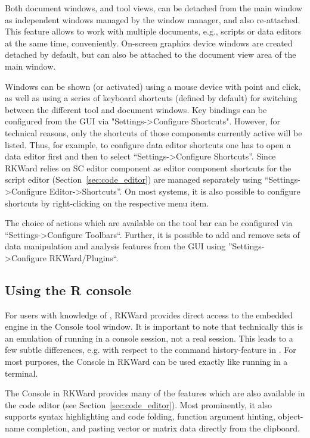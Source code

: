 Both document windows, and tool views, can be detached from the main
window as independent windows managed by the window manager, and also
re-attached. This feature allows to work with multiple documents, e.g.,
scripts or data editors at the same time, conveniently. On{}-screen
graphics device windows are created detached by default, but can also
be attached to the document view area of the main window.

Windows can be shown (or activated) using a mouse device with point and
click, as well as using a series of keyboard shortcuts (defined by
default) for switching between the different tool and document windows.
Key bindings can be configured from the GUI via "Settings->Configure Shortcuts". 
However, for technical reasons, only the shortcuts of those
components currently active will be listed. Thus, for example, to
configure data editor shortcuts one has to open a data editor first and
then to select ``Settings->Configure Shortcuts''. Since RKWard relies on
 SC editor component as editor component
shortcuts for the script editor (Section~\ref{sec:code_editor}) are managed separately using
``Settings->Configure Editor->Shortcuts''. On most systems, it is also
possible to configure shortcuts by right-clicking on the respective
menu item.

The choice of actions which are available on the tool bar can be
configured via ``Settings->Configure Toolbars``. Further, it is possible to add and remove sets
of data manipulation and analysis features from the GUI using
''Settings->Configure RKWard/Plugins``.

\subsection{Using the R console}
\label{sec:using_R_console}
For users with knowledge of , RKWard provides direct access to the
embedded  engine in the
 Console tool window. It is important to note that technically this is an
emulation of  running in a console
session, not a real  session. This leads to a few subtle
differences, e.g. with respect to the command history-feature in
. For most purposes, the  Console in RKWard can be used exactly
like  running in a terminal.

The  Console in RKWard provides many of the
features which are also available in the code editor (see Section~\ref{sec:code_editor}).
Most prominently, it also supports syntax highlighting and code
folding, function argument hinting, object-name completion, and pasting
vector or matrix data directly from the clipboard.

